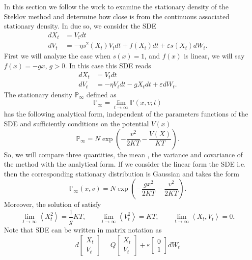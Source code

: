In this section we follow the work \cite{Burrage2007} to examine the 
stationary density of the Steklov method and determine how close is from the continuous associated stationary 
density. In due so, we consider the SDE
\begin{align}
	dX_t &= V_t dt \label{eqn:SecondOrderSDE1}\\ 
	dV_t &= -\eta s^2(X_t)V_tdt + f(X_t)dt + \varepsilon s(X_t) dW_t.
	\label{eqn:SecondOrderSDE2}
\end{align}
First we will analyze the case when $s(x)= 1$, and $f(x)$ is linear, we will say
$f(x) = -gx$, $g>0$. In this case this SDE reads
\begin{align}
	dX_t &= V_t dt	\label{eqn:LinearSecondOrderSDE1}\\
	dV_t &= -\eta V_tdt -gX_t dt + \varepsilon dW_t.\label{eqn:LinearSecondOrderSDE2}
\end{align}
The stationary density $\mathbb{P}_\infty$  defined as
\begin{equation*}
	\mathbb{P}_\infty = \lim_{t\to \infty}\mathbb{P}(x,v;t)
\end{equation*}
has the following analytical form, independent of the parameters functions of the SDE and sufficiently 
conditions on the potential $V(x)$
\begin{equation*}
	\mathbb{P}_\infty = N \exp\left(
		-\frac{v^2}{2KT} -\frac{V(X)}{KT}
		\right).
\end{equation*}
So, we will compare three quantities, the mean , the variance and covariance of 
the method with the analytical form. If we consider the linear form the SDE 
i.e.  then the corresponding stationary distribution is 
Gaussian and 
takes the form
\begin{equation*}
	\mathbb{P}_{\infty}(x,v) = N \exp
	\left(
	-\frac{gx^2}{2KT}
	-\frac{v^2}{2KT}
	\right).
\end{equation*}
Moreover, the solution of  satisfy
\begin{equation*}
	\lim_{t \to \infty} \left\langle X_t^2\right\rangle = \frac{1}{g}KT, \qquad
	\lim_{t \to \infty} \left\langle V_t^2\right\rangle = KT, \qquad
	\lim_{t \to \infty} \left\langle X_t,V_t\right\rangle = 0.
\end{equation*}
Note that SDE  can be written in matrix notation as
\begin{equation}
	d 
	\begin{bmatrix}
		X_t\\ V_t
	\end{bmatrix}
	=
	Q
	\begin{bmatrix}
			X_t\\ V_t
	\end{bmatrix}
	+ \varepsilon
	\begin{bmatrix}
			0\\ 1
	\end{bmatrix}
	dW_t
\end{equation}
